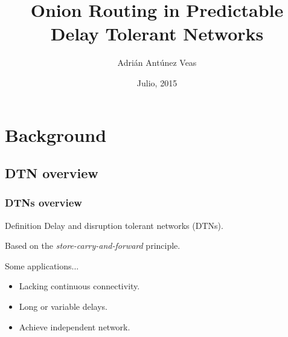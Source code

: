\documentclass[compress,red]{beamer}
\title{Onion Routing in Predictable \\ Delay Tolerant Networks}
\author{Adrián Antúnez Veas}
\institute{dEIC, Universidad Autónoma de Barcelona}
\date{\scriptsize Julio, 2015}
\begin{document}
\thispagestyle{empty}
\AtBeginSection[]
{
}

\frame{
	\titlepage
}

\section[Index]{}
\frame{\tableofcontents[hideallsubsections]
}

\section{Background}
\subsection{DTN overview}
\begin{frame}
\frametitle{DTNs overview}
\begin{block}{Definition}
Delay and disruption tolerant networks (DTNs).
\end{block}
\bigskip 
Based on the \alert{\emph{store-carry-and-forward}} principle.\\
\bigskip
\begin{block}{Some applications...}
\begin{itemize}
\item Lacking continuous connectivity.
\item Long or variable delays.
\item Achieve independent network.
\end{itemize}
\end{block}
\end{frame}
\end{document}

